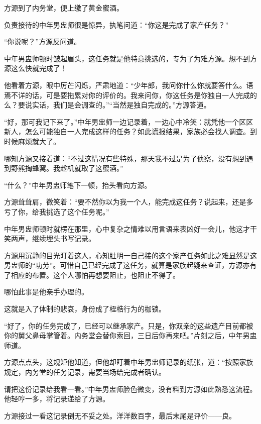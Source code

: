 
\begin{this_body}



方源到了内务堂，便上缴了黄金蜜酒。

负责接待的中年男盅师很是惊异，执笔问道：“你这是完成了家产任务？”

“你说呢？”方源反问道。

中年男盅师顿时皱起眉头，这任务就是他特意挑选的，专为了为难方源。想不到方源这么快就完成了！

他看着方源，眼中厉芒闪烁，严肃地道：“少年郎，我问你什么你就要答什么。语焉不详的话，可是要拖累对你的评价的。我来问你，你这任务是你独自一人完成的么？要说实话，我们是会调查的。”“当然是独自完成的。”方源答道。

“好，那可我记下来了。”中年男盅师一边记录着，一边心中冷笑：就凭他一个区区新人，怎么可能独自一人完成这样的任务？如此谎报结果，家族必会找人调查。到时候麻烦就大了。

哪知方源又接着道：“不过这情况有些特殊，那天我不过是为了侦察，没有想到遇到野熊掏蜂窝。我趁机就取了这蜜酒。”

“什么？”中年男盅师笔下一顿，抬头看向方源。

方源耸耸肩，微笑着：“要不然你以为我一个人，能完成这任务？说起来，还是多亏了你，给我挑选了这个任务呢。”

中年男盅师顿时就楞在那里，心中复杂之情难以用言语来表凶好一会儿，他这才干笑两声，继续埋头书写记录。

方源用沉静的目光盯着这人，心知肚明一自己接的这个家产任务如此之难显然是这男盅师的“功劳”。可惜自己已经完成了这任务，就算是家族起疑来查证，方源亦有了相应的布置。这个人哪怕再想要阻止，也阻止不得了。

哪怕此事是他亲手办理的。

这就是入了体制的悲哀，身份成了桎梏行为的枷锁。

“好了，你的任务完成了，已经可以继承家产。只是，你双亲的这些遗产目前都被你的舅父鼻母掌管着。内务堂会替你索回，三日后你再来吧。”片刻之后，中年男盅师道。

方源点点头，这规矩他知道，但他却盯着中年男盅师记录的纸张，道：“按照家族规定，内务堂的任务记录，需要当场给完成者确认。

请把这份记录给我看一看。”中年男盅师脸色微变，没有料到方源如此熟悉这流程。他轻哼一多，将记录递给了方源。

方源接过一看这记录倒无不妥之处。洋洋数百字，最后末尾是评价——良。


\end{this_body}
